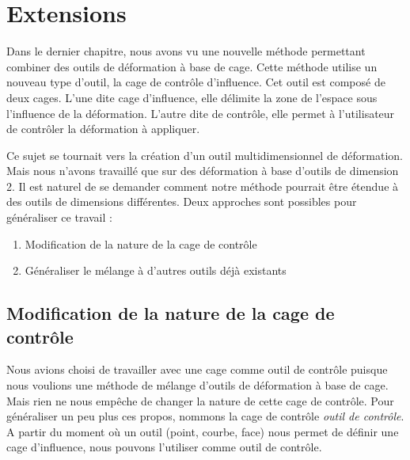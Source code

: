 

\chapter{Extensions}

\graphicspath{ {Chapter4/Chapter4Figs/PNG/}
  {Chapter4/Chapter4Figs/PDF/} {Chapter4/Chapter4Figs/} }

Dans le dernier chapitre, nous avons vu une nouvelle méthode permettant
combiner des outils de déformation à base de cage. Cette méthode utilise un
nouveau type d'outil, la cage de contrôle d'influence. Cet outil est composé
de deux cages. L'une dite cage d'influence, elle délimite la zone de l'espace
sous l'influence de la déformation. L'autre dite de contrôle, elle permet à
l'utilisateur de contrôler la déformation à appliquer.

Ce sujet se tournait vers la création d'un outil multidimensionnel de
déformation. Mais nous n'avons travaillé que sur des déformation à base
d'outils de dimension 2. Il est naturel de se demander comment notre méthode
pourrait être étendue à des outils de dimensions différentes. Deux approches
sont possibles pour généraliser ce travail :

\begin{enumerate}
\item Modification de la nature de la cage de contrôle
\item Généraliser le mélange à d'autres outils déjà existants
\end{enumerate}

\section{Modification de la nature de la cage de contrôle}

Nous avions choisi de travailler avec une cage comme outil de contrôle puisque
nous voulions une méthode de mélange d'outils de déformation à base de cage.
Mais rien ne nous empêche de changer la nature de cette cage de contrôle. Pour
généraliser un peu plus ces propos, nommons la cage de contrôle \textit{outil
de contrôle}. A partir du moment où un outil (point, courbe, face) nous permet
de définir une cage d'influence, nous pouvons l'utiliser comme outil de
contrôle.

